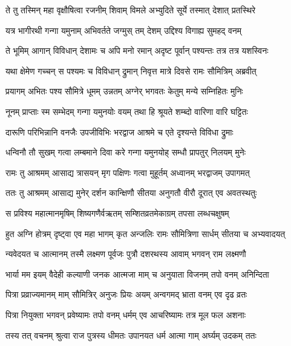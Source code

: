 
\twolineshloka
{ते तु तस्मिन् महा वृक्षौषित्वा रजनीम् शिवाम्}
{विमले अभ्युदिते सूर्ये तस्मात् देशात् प्रतस्थिरे} %

\twolineshloka
{यत्र भागीरथी गन्गा यमुनाम् अभिवर्तते}
{जग्मुस् तम् देशम् उद्दिश्य विगाह्य सुमहद् वनम्} %

\twolineshloka
{ते भूमिम् आगान् विविधान् देशामः च अपि मनो रमान्}
{अदृष्ट पूर्वान् पश्यन्तः तत्र तत्र यशस्विनः} %

\twolineshloka
{यथा क्षेमेण गच्चन् स पश्यमः च विविधान् द्रुमान्}
{निवृत्त मात्रे दिवसे रामः सौमित्रिम् अब्रवीत्} %

\twolineshloka
{प्रयागम् अभितः पश्य सौमित्रे धूमम् उन्नतम्}
{अग्नेर् भगवतः केतुम् मन्ये सम्निहितः मुनिः} %

\twolineshloka
{नूनम् प्राप्ताः स्म सम्भेदम् गन्गा यमुनयोः वयम्}
{तथा हि श्रूयते शम्ब्दो वारिणा वारि घट्टितः} %

\twolineshloka
{दारूणि परिभिन्नानि वनजैः उपजीविभिः}
{भरद्वाज आश्रमे च एते दृश्यन्ते विविधा द्रुमाः} %

\twolineshloka
{धन्विनौ तौ सुखम् गत्वा लम्बमाने दिवा करे}
{गन्गा यमुनयोह् सम्धौ प्रापतुर् निलयम् मुनेः} %

\twolineshloka
{रामः तु आश्रमम् आसाद्य त्रासयन् मृग पक्षिणः}
{गत्वा मुहूर्तम् अध्वानम् भरद्वाजम् उपागमत्} %

\twolineshloka
{ततः तु आश्रमम् आसाद्य मुनेर् दर्शन कान्क्षिणौ}
{सीतया अनुगतौ वीरौ दूरात् एव अवतस्थतुः} %

\twolineshloka
{स प्रविश्य महात्मानमृषिम् शिष्यगणैर्वऋतम्}
{सम्शितव्रतमेकाग्रम् तपसा लब्धचक्षुषम्} %

\twolineshloka
{हुत अग्नि होत्रम् दृष्ट्वा एव महा भागम् कृत अन्जलिः}
{रामः सौमित्रिणा सार्धम् सीतया च अभ्यवादयत्} %

\twolineshloka
{न्यवेदयत च आत्मानम् तस्मै लक्ष्मण पूर्वजः}
{पुत्रौ दशरथस्य आवाम् भगवन् राम लक्ष्मणौ} %

\twolineshloka
{भार्या मम इयम् वैदेही कल्याणी जनक आत्मजा}
{माम् च अनुयाता विजनम् तपो वनम् अनिन्दिता} %

\twolineshloka
{पित्रा प्रव्राज्यमानम् माम् सौमित्रिर् अनुजः प्रियः}
{अयम् अन्वगमद् भ्राता वनम् एव दृढ व्रतः} %

\twolineshloka
{पित्रा नियुक्ता भगवन् प्रवेष्यामः तपो वनम्}
{धर्मम् एव आचरिष्यामः तत्र मूल फल अशनाः} %

\twolineshloka
{तस्य तत् वचनम् श्रुत्वा राज पुत्रस्य धीमतः}
{उपानयत धर्म आत्मा गाम् अर्घ्यम् उदकम् ततः} %

